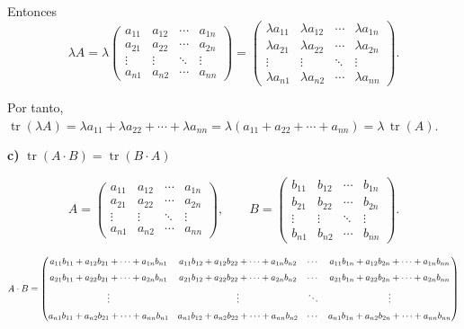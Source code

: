 \documentclass[a4paper,12pt]{article}
\begin{document}
\begin{ejercicio}[title=Ejercicio 7]

Entonces
\[
\lambda A
=
\lambda
\begin{pmatrix}
a_{11} & a_{12} & \cdots & a_{1n} \\
a_{21} & a_{22} & \cdots & a_{2n} \\
\vdots & \vdots & \ddots & \vdots \\
a_{n1} & a_{n2} & \cdots & a_{nn}
\end{pmatrix}
=
\begin{pmatrix}
\lambda a_{11} & \lambda a_{12} & \cdots & \lambda a_{1n} \\
\lambda a_{21} & \lambda a_{22} & \cdots & \lambda a_{2n} \\
\vdots & \vdots & \ddots & \vdots \\
\lambda a_{n1} & \lambda a_{n2} & \cdots & \lambda a_{nn}
\end{pmatrix}.
\]

Por tanto,
\(
\operatorname{tr}(\lambda A)
= \lambda a_{11} + \lambda a_{22} + \cdots + \lambda a_{nn}
= \lambda (a_{11} + a_{22} + \cdots + a_{nn})
= \boxed{\lambda\,\operatorname{tr}(A)}.
\)

\textbf{c)} $\operatorname{tr}(A \cdot B) = \operatorname{tr}(B \cdot A)$

\[
A =
\begin{pmatrix}
a_{11} & a_{12} & \cdots & a_{1n} \\
a_{21} & a_{22} & \cdots & a_{2n} \\
\vdots & \vdots & \ddots & \vdots \\
a_{n1} & a_{n2} & \cdots & a_{nn}
\end{pmatrix},
\qquad
B =
\begin{pmatrix}
b_{11} & b_{12} & \cdots & b_{1n} \\
b_{21} & b_{22} & \cdots & b_{2n} \\
\vdots & \vdots & \ddots & \vdots \\
b_{n1} & b_{n2} & \cdots & b_{nn}
\end{pmatrix}.
\]

\[
\scalebox{0.75}{$
A\cdot B =
\begin{pmatrix}
a_{11}b_{11} + a_{12}b_{21} + \cdots + a_{1n}b_{n1} & 
a_{11}b_{12} + a_{12}b_{22} + \cdots + a_{1n}b_{n2} & 
\cdots & 
a_{11}b_{1n} + a_{12}b_{2n} + \cdots + a_{1n}b_{nn} \\[6pt]
a_{21}b_{11} + a_{22}b_{21} + \cdots + a_{2n}b_{n1} & 
a_{21}b_{12} + a_{22}b_{22} + \cdots + a_{2n}b_{n2} & 
\cdots & 
a_{21}b_{1n} + a_{22}b_{2n} + \cdots + a_{2n}b_{nn} \\[6pt]
\vdots & \vdots & \ddots & \vdots \\[6pt]
a_{n1}b_{11} + a_{n2}b_{21} + \cdots + a_{nn}b_{n1} & 
a_{n1}b_{12} + a_{n2}b_{22} + \cdots + a_{nn}b_{n2} & 
\cdots & 
a_{n1}b_{1n} + a_{n2}b_{2n} + \cdots + a_{nn}b_{nn}
\end{pmatrix}
$}
\]


\end{ejercicio}
\end{document}
